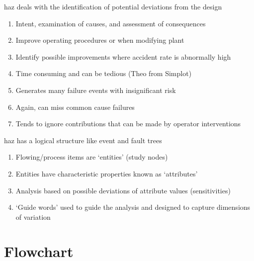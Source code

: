 \documentclass[aspectratio=1610,pdftex,dvipsnames,compress,xcolor={dvipsnames}]{beamer}
\newcommand{\acs}{\acrshort} %
\begin{document}
\begin{frame}{\acs{haz} deals with the identification of potential deviations from the design}
    \begin{enumerate}[series=outerlist,topsep=0pt,itemsep=17pt,leftmargin=*,label=(\arabic*)]
        \item[]Intent, examination of causes, and assessment of consequences
        \item[]Improve operating procedures or when modifying plant 
        \item[]Identify possible improvements where accident rate is abnormally high 
        \item[]Time consuming and can be tedious (Theo from Simplot)
        \item[]Generates many failure events with insignificant risk  
        \item[]Again, can miss common cause failures
        \item[]Tends to ignore contributions that can be made by operator interventions 
    \end{enumerate}
\end{frame}


\begin{frame}{\acs{haz} has a logical structure like event and fault trees}
    \begin{enumerate}[series=outerlist,topsep=0pt,itemsep=21pt,leftmargin=*,label=(\arabic*)]
        \item[]Flowing/process items are `entities' (study nodes)
        \item[]Entities have characteristic properties known as `attributes'
        \item[]Analysis based on possible deviations of attribute values (sensitivities)
        \item[]`Guide words' used to guide the analysis and designed to capture dimensions of variation
    \end{enumerate}
\end{frame}


\section{Flowchart}
\end{document}
